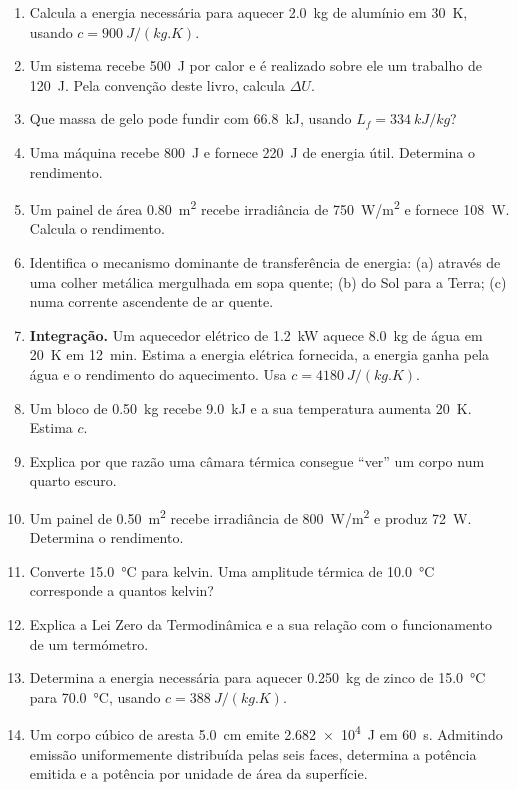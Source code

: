 \documentclass[11pt,a4paper,oneside]{book}
\begin{document}
\begin{exercicios}
\begin{enumerate}
  \item Calcula a energia necessária para aquecer \SI{2.0}{kg} de alumínio em \SI{30}{K}, usando $c=\SI{900}{J/(kg.K)}$.
  \item Um sistema recebe \SI{500}{J} por calor e é realizado sobre ele um trabalho de \SI{120}{J}. Pela convenção deste livro, calcula $\Delta U$.
  \item Que massa de gelo pode fundir com \SI{66.8}{kJ}, usando $L_f=\SI{334}{kJ/kg}$?
  \item Uma máquina recebe \SI{800}{J} e fornece \SI{220}{J} de energia útil. Determina o rendimento.
  \item Um painel de área \SI{0.80}{m^2} recebe irradiância de \SI{750}{W/m^2} e fornece \SI{108}{W}. Calcula o rendimento.
  \item Identifica o mecanismo dominante de transferência de energia: (a) através de uma colher metálica mergulhada em sopa quente; (b) do Sol para a Terra; (c) numa corrente ascendente de ar quente.
  \item \textbf{Integração.} Um aquecedor elétrico de \SI{1.2}{kW} aquece \SI{8.0}{kg} de água em \SI{20}{K} em \SI{12}{min}. Estima a energia elétrica fornecida, a energia ganha pela água e o rendimento do aquecimento. Usa $c=\SI{4180}{J/(kg.K)}$.
  \item Um bloco de \SI{0.50}{kg} recebe \SI{9.0}{kJ} e a sua temperatura aumenta \SI{20}{K}. Estima $c$.
  \item Explica por que razão uma câmara térmica consegue ``ver'' um corpo num quarto escuro.
  \item Um painel de \SI{0.50}{m^2} recebe irradiância de \SI{800}{W/m^2} e produz \SI{72}{W}. Determina o rendimento.
  \item Converte \SI{15.0}{\celsius} para kelvin. Uma amplitude térmica de \SI{10.0}{\celsius} corresponde a quantos kelvin?
  \item Explica a Lei Zero da Termodinâmica e a sua relação com o funcionamento de um termómetro.
  \item Determina a energia necessária para aquecer \SI{0.250}{kg} de zinco de \SI{15.0}{\celsius} para \SI{70.0}{\celsius}, usando $c=\SI{388}{J/(kg.K)}$.
  \item Um corpo cúbico de aresta \SI{5.0}{cm} emite \SI{2.682e4}{J} em \SI{60}{s}. Admitindo emissão uniformemente distribuída pelas seis faces, determina a potência emitida e a potência por unidade de área da superfície.

\end{enumerate}
\end{exercicios}
\end{document}
